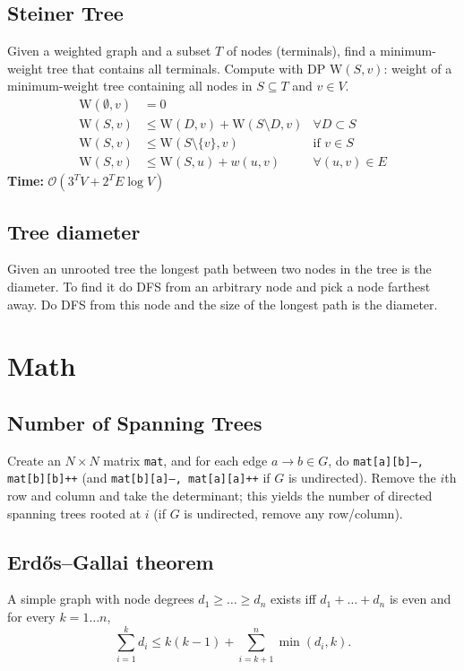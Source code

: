     \subsection{Steiner Tree}
        Given a weighted graph and a subset $T$ of nodes (terminals), find a
        minimum-weight tree that contains all terminals.
        Compute with DP $\text{W}(S, v)$: weight of a minimum-weight tree
        containing all nodes in $S \subseteq T$ and $v \in V$.
        \begin{align*}
            \text{W}(\emptyset, v) &= 0 \\
            \text{W}(S, v) &\leq \text{W}(D, v) + \text{W}(S \setminus D, v) &
            \forall D \subset S \\
            \text{W}(S, v) &\leq \text{W}(S \setminus \{v\}, v) & \text{if } v \in S \\
            \text{W}(S, v) &\leq \text{W}(S, u) + w(u, v) & \forall (u, v) \in E
        \end{align*}
        {\small \textbf{Time:} $\mathcal{O}(3^T V + 2^T E \log V)$}

    \subsection{Tree diameter}
        Given an unrooted tree the longest path between two nodes in the tree is the diameter. To find it do DFS from an arbitrary node and pick a node farthest away. Do DFS from this node and the size of the longest path is the diameter.
        


\section{Math}
	\subsection{Number of Spanning Trees}
		Create an $N\times N$ matrix \texttt{mat}, and for each edge $a \rightarrow b \in G$, do
		\texttt{mat[a][b]--, mat[b][b]++} (and \texttt{mat[b][a]--, mat[a][a]++} if $G$ is undirected).
		Remove the $i$th row and column and take the determinant; this yields the number of directed spanning trees rooted at $i$
		(if $G$ is undirected, remove any row/column).

	\subsection{Erdős–Gallai theorem}
		A simple graph with node degrees $d_1 \ge \dots \ge d_n$ exists iff $d_1 + \dots + d_n$ is even and for every $k = 1\dots n$,
		\[ \sum _{i=1}^{k}d_{i}\leq k(k-1)+\sum _{i=k+1}^{n}\min(d_{i},k). \]
